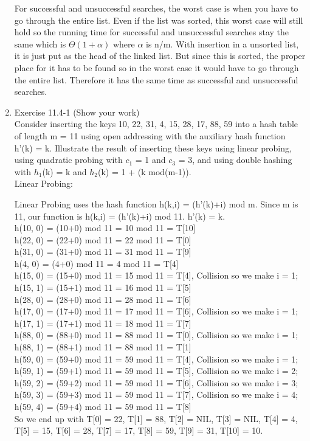\documentclass[12pt]{article}
\begin{document}
\begin{enumerate}
For successful and unsuccessful searches, the worst case is when you have to go through the entire list. Even if the list was sorted, this worst case will still hold so the running time for successful and unsuccessful searches stay the same which is $\Theta(1 + \alpha)$ where $\alpha$ is n/m. With insertion in a unsorted list, it is just put as the head of the linked list. But since this is sorted, the proper place for it has to be found so in the worst case it would have to go through the entire list. Therefore it has the same time as successful and unsuccessful searches.

\item Exercise 11.4-1 (Show your work) \\
Consider inserting the keys 10, 22, 31, 4, 15, 28, 17, 88, 59 into a hash table of
length m = 11 using open addressing with the auxiliary hash function h'(k) = k.
Illustrate the result of inserting these keys using linear probing, using quadratic
probing with $c_1$ = 1 and $c_3$ = 3, and using double hashing with  $h_1$(k) = k and $h_2$(k) = 1 + (k mod(m-1)). \\

Linear Probing:

Linear Probing uses the hash function h(k,i) = (h'(k)+i) mod m. Since m is 11, our function is h(k,i) = (h'(k)+i) mod 11. h'(k) = k.\\

h(10, 0) = (10+0) mod 11 = 10 mod 11 = T[10]\\
h(22, 0) = (22+0) mod 11 = 22 mod 11 = T[0]\\
h(31, 0) = (31+0) mod 11 = 31 mod 11 = T[9]\\
h(4, 0) = (4+0) mod 11 = 4 mod 11 = T[4]\\
h(15, 0) = (15+0) mod 11 = 15 mod 11 = T[4], Collision so we make i = 1;\\
h(15, 1) = (15+1) mod 11 = 16 mod 11 = T[5]\\
h(28, 0) = (28+0) mod 11 = 28 mod 11 = T[6]\\
h(17, 0) = (17+0) mod 11 = 17 mod 11 = T[6], Collision so we make i = 1;\\
h(17, 1) = (17+1) mod 11 = 18 mod 11 = T[7]\\
h(88, 0) = (88+0) mod 11 = 88 mod 11 = T[0], Collision so we make i = 1;\\
h(88, 1) = (88+1) mod 11 = 88 mod 11 = T[1]\\
h(59, 0) = (59+0) mod 11 = 59 mod 11 = T[4], Collision so we make i = 1;\\
h(59, 1) = (59+1) mod 11 = 59 mod 11 = T[5], Collision so we make i = 2;\\
h(59, 2) = (59+2) mod 11 = 59 mod 11 = T[6], Collision so we make i = 3;\\
h(59, 3) = (59+3) mod 11 = 59 mod 11 = T[7], Collision so we make i = 4;\\
h(59, 4) = (59+4) mod 11 = 59 mod 11 = T[8]\\
So we end up with T[0] = 22, T[1] = 88, T[2] = NIL, T[3] = NIL, T[4] = 4, T[5] = 15, T[6] = 28, T[7] = 17, T[8] = 59, T[9] = 31, T[10] = 10.\\


\end{enumerate}
\end{document}
